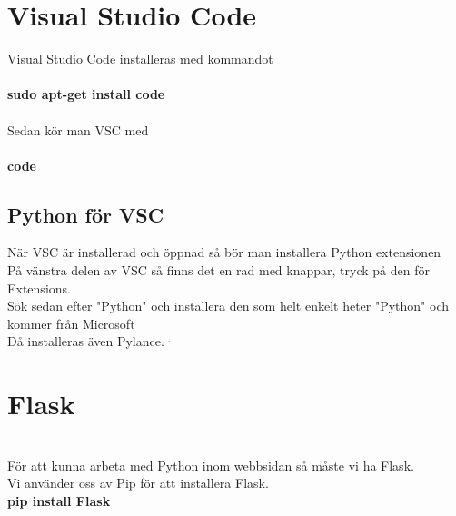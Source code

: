 \documentclass{TDP003mall}
\begin{document}
\section{Visual Studio Code}
Visual Studio Code installeras med kommandot\\\\
\textbf{sudo apt-get install code}\\\\ 
Sedan kör man VSC med\\\\
\textbf{code}
\subsection{Python för VSC}
När VSC är installerad och öppnad så bör man installera Python extensionen\\
På vänstra delen av VSC så finns det en rad med knappar, tryck på den för Extensions.\\
Sök sedan efter "Python" och installera den som helt enkelt heter "Python" och kommer från Microsoft\\
Då installeras även Pylance.·\\


\section{Flask}\\
För att kunna arbeta med Python inom webbsidan så måste vi ha Flask.\\
Vi använder oss av Pip för att installera Flask.\\
\textbf{pip install Flask}\\
\end{document}
